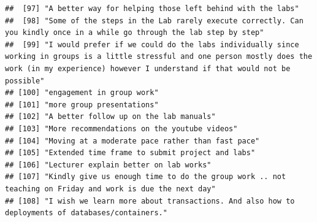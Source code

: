 \documentclass[
]{article}
\begin{document}
\begin{verbatim}
##  [97] "A better way for helping those left behind with the labs"                                                                                                                                                              
##  [98] "Some of the steps in the Lab rarely execute correctly. Can you kindly once in a while go through the lab step by step"                                                                                                 
##  [99] "I would prefer if we could do the labs individually since working in groups is a little stressful and one person mostly does the work (in my experience) however I understand if that would not be possible"           
## [100] "engagement in group work"                                                                                                                                                                                              
## [101] "more group presentations"                                                                                                                                                                                              
## [102] "A better follow up on the lab manuals"                                                                                                                                                                                 
## [103] "More recommendations on the youtube videos"                                                                                                                                                                            
## [104] "Moving at a moderate pace rather than fast pace"                                                                                                                                                                       
## [105] "Extended time frame to submit project and labs"                                                                                                                                                                        
## [106] "Lecturer explain better on lab works"                                                                                                                                                                                  
## [107] "Kindly give us enough time to do the group work .. not teaching on Friday and work is due the next day"                                                                                                                
## [108] "I wish we learn more about transactions. And also how to deployments of databases/containers."                                                                                                                         

\end{verbatim}
\end{document}
